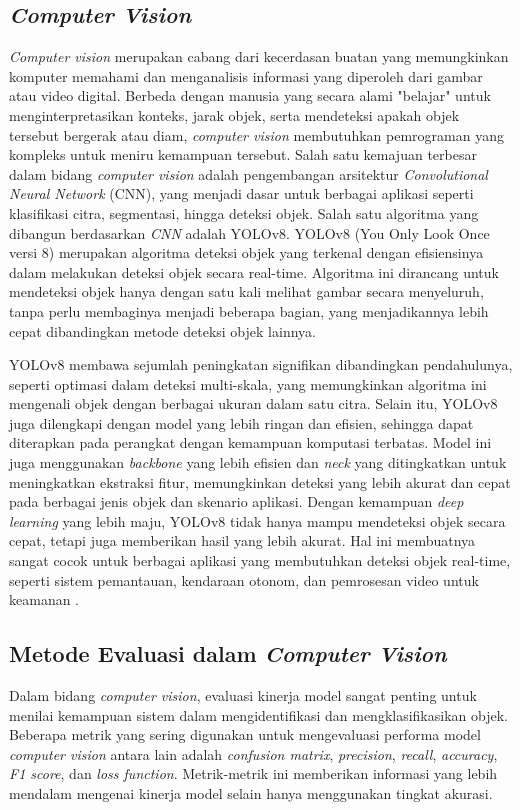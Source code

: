 \subsection{\emph{Computer Vision}}
\emph{Computer vision} merupakan cabang dari kecerdasan buatan yang memungkinkan komputer memahami dan menganalisis informasi yang diperoleh dari gambar atau video digital. Berbeda dengan manusia yang secara alami "belajar" untuk menginterpretasikan konteks, jarak objek, serta mendeteksi apakah objek tersebut bergerak atau diam, \emph{computer vision} membutuhkan pemrograman yang kompleks untuk meniru kemampuan tersebut. Salah satu kemajuan terbesar dalam bidang \emph{computer vision} adalah pengembangan arsitektur \emph{Convolutional Neural Network} (CNN), yang menjadi dasar untuk berbagai aplikasi seperti klasifikasi citra, segmentasi, hingga deteksi objek. Salah satu algoritma yang dibangun berdasarkan \emph{CNN} adalah YOLOv8. YOLOv8 (You Only Look Once versi 8) merupakan algoritma deteksi objek yang terkenal dengan efisiensinya dalam melakukan deteksi objek secara real-time. Algoritma ini dirancang untuk mendeteksi objek hanya dengan satu kali melihat gambar secara menyeluruh, tanpa perlu membaginya menjadi beberapa bagian, yang menjadikannya lebih cepat dibandingkan metode deteksi objek lainnya.

YOLOv8 membawa sejumlah peningkatan signifikan dibandingkan pendahulunya, seperti optimasi dalam deteksi multi-skala, yang memungkinkan algoritma ini mengenali objek dengan berbagai ukuran dalam satu citra. Selain itu, YOLOv8 juga dilengkapi dengan model yang lebih ringan dan efisien, sehingga dapat diterapkan pada perangkat dengan kemampuan komputasi terbatas. Model ini juga menggunakan \emph{backbone} yang lebih efisien dan \emph{neck} yang ditingkatkan untuk meningkatkan ekstraksi fitur, memungkinkan deteksi yang lebih akurat dan cepat pada berbagai jenis objek dan skenario aplikasi. Dengan kemampuan \emph{deep learning} yang lebih maju, YOLOv8 tidak hanya mampu mendeteksi objek secara cepat, tetapi juga memberikan hasil yang lebih akurat. Hal ini membuatnya sangat cocok untuk berbagai aplikasi yang membutuhkan deteksi objek real-time, seperti sistem pemantauan, kendaraan otonom, dan pemrosesan video untuk keamanan \cite{yolov8}.


\subsection{Metode Evaluasi dalam \emph{Computer Vision}}
Dalam bidang \emph{computer vision}, evaluasi kinerja model sangat penting untuk menilai kemampuan sistem dalam mengidentifikasi dan mengklasifikasikan objek. Beberapa metrik yang sering digunakan untuk mengevaluasi performa model \emph{computer vision} antara lain adalah \emph{confusion matrix}, \emph{precision}, \emph{recall}, \emph{accuracy}, \emph{F1 score}, dan \emph{loss function}. Metrik-metrik ini memberikan informasi yang lebih mendalam mengenai kinerja model selain hanya menggunakan tingkat akurasi.

